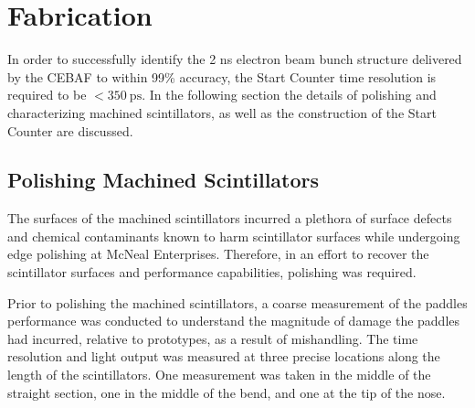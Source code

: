 \section{Fabrication} \label{sec:fab}

In order to successfully identify the 2 ns electron beam bunch structure delivered by the CEBAF to within 99\% accuracy, the \gx{} Start Counter time resolution is required to be $<350\ \mathrm{ps}$.  In the following section the details of polishing and characterizing machined scintillators, as well as the construction of the Start Counter are discussed.

\subsection{Polishing Machined Scintillators} \label{sec:fab_polish}

The surfaces of the machined scintillators incurred a plethora of surface defects and chemical contaminants known to harm scintillator surfaces while undergoing edge polishing at McNeal Enterprises.  Therefore, in an effort to recover the scintillator surfaces and performance capabilities, polishing was required.

Prior to polishing the machined scintillators, a coarse measurement of the paddles performance was conducted to understand the magnitude of damage the paddles had incurred, relative to prototypes, as a result of mishandling.  The time resolution and light output was measured at three precise locations along the length of the scintillators. One measurement was taken in the middle of the straight section, one in the middle of the bend, and one at the tip of the nose. 

